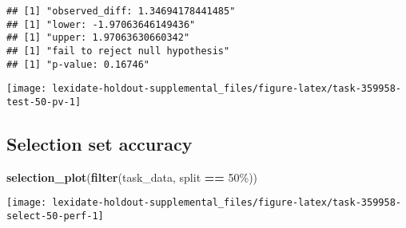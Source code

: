 \documentclass[
]{book}
\newenvironment{Shaded}{\begin{snugshade}}{\end{snugshade}}
\newcommand{\AttributeTok}[1]{\textcolor[rgb]{0.13,0.29,0.53}{#1}}
\newcommand{\DecValTok}[1]{\textcolor[rgb]{0.00,0.00,0.81}{#1}}
\newcommand{\FunctionTok}[1]{\textcolor[rgb]{0.13,0.29,0.53}{\textbf{#1}}}
\newcommand{\NormalTok}[1]{#1}
\newcommand{\OtherTok}[1]{\textcolor[rgb]{0.56,0.35,0.01}{#1}}
\newcommand{\SpecialCharTok}[1]{\textcolor[rgb]{0.81,0.36,0.00}{\textbf{#1}}}
\newcommand{\StringTok}[1]{\textcolor[rgb]{0.31,0.60,0.02}{#1}}
\begin{document}
\begin{Shaded}
\end{Shaded}

\begin{verbatim}
## [1] "observed_diff: 1.34694178441485"
## [1] "lower: -1.97063646149436"
## [1] "upper: 1.97063630660342"
## [1] "fail to reject null hypothesis"
## [1] "p-value: 0.16746"
\end{verbatim}

\texttt{[image: lexidate-holdout-supplemental\_files/figure-latex/task-359958-test-50-pv-1]}

\hypertarget{selection-set-accuracy-32}{%
\subsection{Selection set accuracy}\label{selection-set-accuracy-32}}

\begin{Shaded}
\begin{Highlighting}[]
\FunctionTok{selection\_plot}\NormalTok{(}\FunctionTok{filter}\NormalTok{(task\_data, split }\SpecialCharTok{==} \StringTok{\textquotesingle{}50\%\textquotesingle{}}\NormalTok{))}
\end{Highlighting}
\end{Shaded}

\texttt{[image: lexidate-holdout-supplemental\_files/figure-latex/task-359958-select-50-perf-1]}
\end{document}
